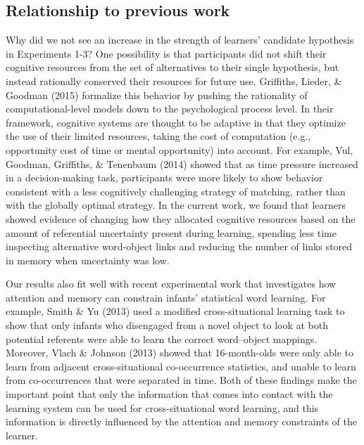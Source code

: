 \documentclass[authoryear, review]{elsarticle}
\begin{document}
\subsection{Relationship to previous
work}\label{relationship-to-previous-work}

Why did we not see an increase in the strength of learners' candidate
hypothesis in Experiments 1-3? One possibility is that participants did
not shift their cognitive resources from the set of alternatives to
their single hypothesis, but instead rationally conserved their
resources for future use. Griffiths, Lieder, \& Goodman (2015) formalize
this behavior by pushing the rationality of computational-level models
down to the psychological process level. In their framework, cognitive
systems are thought to be adaptive in that they optimize the use of
their limited resources, taking the cost of computation (e.g.,
opportunity cost of time or mental opportunity) into account. For
example, Vul, Goodman, Griffiths, \& Tenenbaum (2014) showed that as
time pressure increased in a decision-making task, participants were
more likely to show behavior consistent with a less cognitively
challenging strategy of matching, rather than with the globally optimal
strategy. In the current work, we found that learners showed evidence of
changing how they allocated cognitive resources based on the amount of
referential uncertainty present during learning, spending less time
inspecting alternative word-object links and reducing the number of
links stored in memory when uncertainty was low.

Our results also fit well with recent experimental work that
investigates how attention and memory can constrain infants' statistical
word learning. For example, Smith \& Yu (2013) used a modified
cross-situational learning task to show that only infants who disengaged
from a novel object to look at both potential referents were able to
learn the correct word--object mappings. Moreover, Vlach \& Johnson
(2013) showed that 16-month-olds were only able to learn from adjacent
cross-situational co-occurrence statistics, and unable to learn from
co-occurrences that were separated in time. Both of these findings make
the important point that only the information that comes into contact
with the learning system can be used for cross-situational word
learning, and this information is directly influenced by the attention
and memory constraints of the learner.
\end{document}
